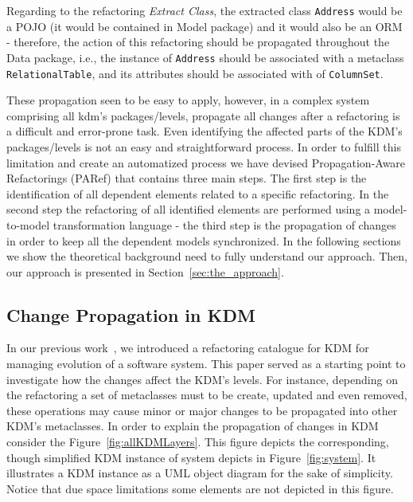 Regarding to the refactoring \textit{Extract Class}, the extracted class \texttt{Address} would be a POJO (it would be contained in Model package) and it would also be an ORM - therefore, the action of this refactoring should be propagated throughout  the Data package, i.e., the instance of \texttt{Address} should be associated with a metaclass \texttt{RelationalTable}, and its attributes should be associated with  of \texttt{ColumnSet}.


These propagation seen to be easy to apply, however, in a complex system comprising all kdm's packages/levels, propagate all changes after a refactoring is a difficult and error-prone task. Even identifying the affected parts of the KDM's packages/levels is not an easy and straightforward process. In order to fulfill this limitation and create an automatized process we have devised Propagation-Aware Refactorings (PARef) that contains three main steps. The first step is the identification of all dependent elements related to a specific refactoring. In the second step the refactoring of all identified elements are performed using a model-to-model transformation language - the third step is the propagation of changes in order to keep all the dependent models synchronized. %
In the following sections we show the theoretical background need to fully understand our approach. Then, our approach is presented in Section~\ref{sec:the_approach}.
 




\subsection{Change Propagation in KDM} %
\label{sub:change_propagation_in_kdm}

In our previous work~\cite{IRIDurelliCatalogo}, we introduced a refactoring catalogue for KDM for managing evolution of a software system. This paper served as a starting point to investigate how the changes affect the KDM's levels. For instance, depending on the refactoring a set of metaclasses must to be create, updated and even removed, these operations may cause minor or major changes to be propagated into other KDM's metaclasses. In order to explain the propagation of changes in KDM consider the Figure~\ref{fig:allKDMLayers}. This figure depicts the corresponding, though simplified KDM instance of system depicts in Figure~\ref{fig:system}. It illustrates a KDM instance as a UML object diagram for the sake of simplicity. Notice that due space limitations some elements are not depicted in this figure.

